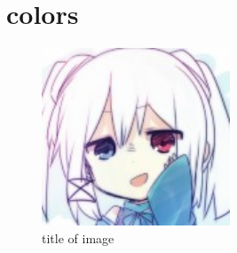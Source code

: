 \documentclass[11pt,a4paper]{article}
\begin{document}
\section{colors}{
  \begin{figure}[!h]
    \centering
    \begin{turn}{45}
      \includegraphics[width=0.5\textwidth,bb=0 0 140 132]{head_image.jpg}
    \end{turn}
    \caption{\color{tianyi_blue} title of image}
  \end{figure}
}
\clearpage
\end{document}
